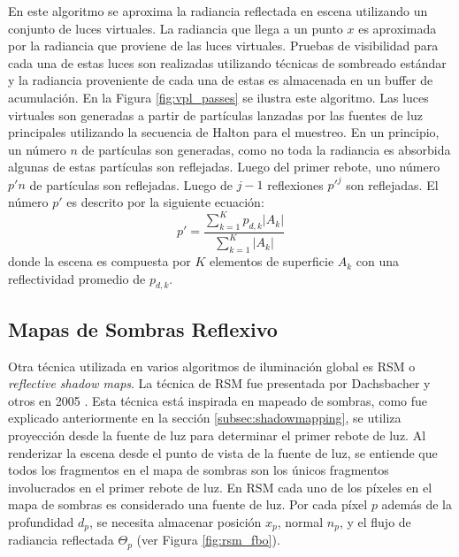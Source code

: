 En este algoritmo se aproxima la radiancia reflectada en escena utilizando un conjunto de luces virtuales. La radiancia que llega a un punto $x$ es aproximada por la radiancia que proviene de las luces virtuales. Pruebas de visibilidad para cada una de estas luces son realizadas utilizando técnicas de sombreado estándar y la radiancia proveniente de cada una de estas es almacenada en un buffer de acumulación. En la Figura \ref{fig:vpl_passes} se ilustra este algoritmo.
Las luces virtuales son generadas a partir de partículas lanzadas por las fuentes de luz principales utilizando la secuencia de Halton para el muestreo. En un principio, un número $n$ de partículas son generadas, como no toda la radiancia es absorbida algunas de estas partículas son reflejadas. Luego del primer rebote, uno número $p'n$ de partículas son reflejadas. Luego de $j-1$ reflexiones $p'^j$ son reflejadas. El número $p'$ es descrito por la siguiente ecuación:
\begin{equation}
    p' = \frac{\sum_{k=1}^{K} p_{d,k}|A_{k}|}{\sum_{k=1}^{K}|A_{k}|}
    \label{eq:reflected_vpls}
\end{equation} donde la escena es compuesta por $K$ elementos de superficie $A_{k}$ con una reflectividad promedio de $p_{d,k}$.

\subsection{Mapas de Sombras Reflexivo}
Otra técnica utilizada en varios algoritmos de iluminación global es \ac{RSM} o \emph{reflective shadow maps}. La técnica de \ac{RSM} fue presentada por Dachsbacher y otros en 2005 \cite{Dachsbacher:2005}.  Esta técnica está inspirada en mapeado de sombras, como fue explicado anteriormente en la sección \ref{subsec:shadowmapping}, se utiliza proyección desde la fuente de luz para determinar el primer rebote de luz. Al renderizar la escena desde el punto de vista de la fuente de luz, se entiende que todos los fragmentos en el mapa de sombras son los únicos fragmentos involucrados en el primer rebote de luz. En \ac{RSM} cada uno de los píxeles en el mapa de sombras es considerado una fuente de luz. Por cada píxel $p$ además de la profundidad $d_{p}$, se necesita almacenar posición $x_{p}$, normal $n_{p}$, y el flujo de radiancia reflectada $\Theta_{p}$ (ver Figura \ref{fig:rsm_fbo}).

